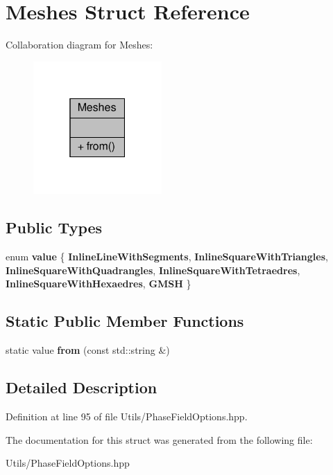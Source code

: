 \hypertarget{structMeshes}{}\section{Meshes Struct Reference}
\label{structMeshes}


Collaboration diagram for Meshes\+:\nopagebreak
\begin{figure}[H]
\begin{center}
\leavevmode
\includegraphics[width=139pt]{structMeshes__coll__graph}
\end{center}
\end{figure}
\subsection*{Public Types}
\begin{DoxyCompactItemize}
\item 
\mbox{\label{structMeshes_a17ce7cdf7c4aef0633ce80f5e526b706}} 
enum {\bfseries value} \{ \newline
{\bfseries Inline\+Line\+With\+Segments}, 
{\bfseries Inline\+Square\+With\+Triangles}, 
{\bfseries Inline\+Square\+With\+Quadrangles}, 
{\bfseries Inline\+Square\+With\+Tetraedres}, 
\newline
{\bfseries Inline\+Square\+With\+Hexaedres}, 
{\bfseries G\+M\+SH}
 \}
\end{DoxyCompactItemize}
\subsection*{Static Public Member Functions}
\begin{DoxyCompactItemize}
\item 
\mbox{\label{structMeshes_a41bce2494d7e83bb16a7f79faf1c5d97}} 
static value {\bfseries from} (const std\+::string \&)
\end{DoxyCompactItemize}


\subsection{Detailed Description}


Definition at line 95 of file Utils/\+Phase\+Field\+Options.\+hpp.



The documentation for this struct was generated from the following file\+:\begin{DoxyCompactItemize}
\item 
Utils/\+Phase\+Field\+Options.\+hpp\end{DoxyCompactItemize}
